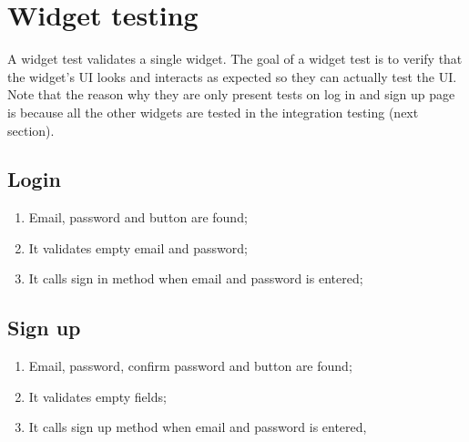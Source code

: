 \documentclass[../ITD.tex]{subfiles}
\begin{document}
    \section{Widget testing}\label{sec:widget-testing}
    A widget test validates a single widget.
    The goal of a widget test is to verify that the widget’s UI looks and interacts as expected so they can actually test the UI.
    Note that the reason why they are only present tests on log in and sign up page is because all the other widgets are tested in
    the integration testing (next section).
    \subsection{Login}\label{subsec:login}
    \begin{enumerate}
        \item Email, password and button are found;
        \item It validates empty email and password;
        \item It calls sign in method when email and password is entered;
    \end{enumerate}

    \subsection{Sign up}\label{subsec:sign-up}
    \begin{enumerate}
        \item Email, password, confirm password and button are found;
        \item It validates empty fields;
        \item It calls sign up method when email and password is entered,
    \end{enumerate}
\end{document}
